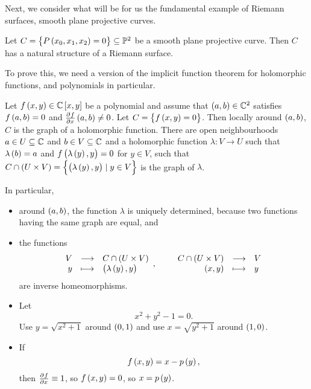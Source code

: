 Next, we consider what will be for us the fundamental example of Riemann surfaces, smooth plane projective curves.

\begin{lemma}
\label{lem:15.5}
Let $ C = \cbr{P\br{x_0, x_1, x_2} = 0} \subseteq \P^2 $ be a smooth plane projective curve. Then $ C $ has a natural structure of a Riemann surface.
\end{lemma}

To prove this, we need a version of the implicit function theorem for holomorphic functions, and polynomials in particular.

\begin{theorem}
Let $ f\br{x, y} \in \C\sbr{x, y} $ be a polynomial and assume that $ \br{a, b} \in \C^2 $ satisfies $ f\br{a, b} = 0 $ and $ \tpd{f}{x}\br{a, b} \ne 0 $. Let $ C = \cbr{f\br{x, y} = 0} $. Then locally around $ \br{a, b} $, $ C $ is the graph of a holomorphic function. There are open neighbourhoods $ a \in U \subseteq \mathbb{C} $ and $ b \in V \subseteq \mathbb{C} $ and a holomorphic function $ \lambda : V \to U $ such that $ \lambda\br{b} = a $ and $ f\br{\lambda\br{y}, y} = 0 $ for $ y \in V $, such that $ C \cap \br{U \times V} = \cbr{\br{\lambda\br{y}, y} \mid y \in V} $ is the graph of $ \lambda $.
\end{theorem}

\begin{note*}
In particular,
\begin{itemize}
\item around $ \br{a, b} $, the function $ \lambda $ is uniquely determined, because two functions having the same graph are equal, and
\item the functions
$$ \function{V}{C \cap \br{U \times V}}{y}{\br{\lambda\br{y}, y}}, \qquad \function{C \cap \br{U \times V}}{V}{\br{x, y}}{y} $$
are inverse homeomorphisms.
\end{itemize}
\end{note*}

\begin{example*}
\hfill
\begin{itemize}
\item Let
$$ x^2 + y^2 - 1 = 0. $$
Use $ y = \sqrt{x^2 + 1} $ around $ \br{0, 1} $ and use $ x = \sqrt{y^2 + 1} $ around $ \br{1, 0} $.
\item If
$$ f\br{x, y} = x - p\br{y}, $$
then $ \tpd{f}{x} \equiv 1 $, so $ f\br{x, y} = 0 $, so $ x = p\br{y} $.
\end{itemize}
\end{example*}

